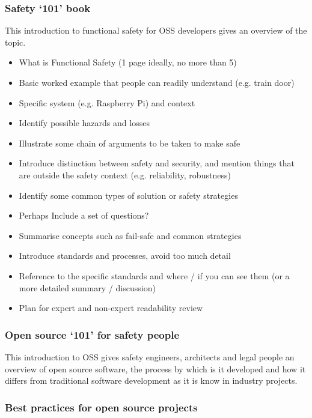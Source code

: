 \documentclass[12pt]{ElisaPaper}
\begin{document}
\subsubsection{Safety ‘101’ book}
This introduction to functional safety for OSS developers gives an overview of the topic.
\begin{itemize}	
\item What is Functional Safety (1 page ideally, no more than 5)
\item Basic worked example that people can readily understand (e.g. train door)
\item Specific system (e.g. Raspberry Pi) and context
\item Identify possible hazards and losses
\item Illustrate some chain of arguments to be taken to make safe
\item Introduce distinction between safety and security, and mention things that are outside the safety context (e.g. reliability, robustness)
\item Identify some common types of solution or safety strategies
\item Perhaps Include a set of questions?
\item Summarise concepts such as fail-safe and common strategies 
\item Introduce standards and processes, avoid too much detail
\item Reference to the specific standards and where / if you can see them (or a more detailed summary / discussion)
\item Plan for expert and non-expert readability review
\end{itemize}


\subsubsection{Open source ‘101’ for safety people}
This introduction to OSS gives safety engineers, architects and legal people an overview of open source software, the process by which is it developed and how it differs from traditional software development as it is know in industry projects.

\subsubsection{Best practices for open source projects}
\end{document}
